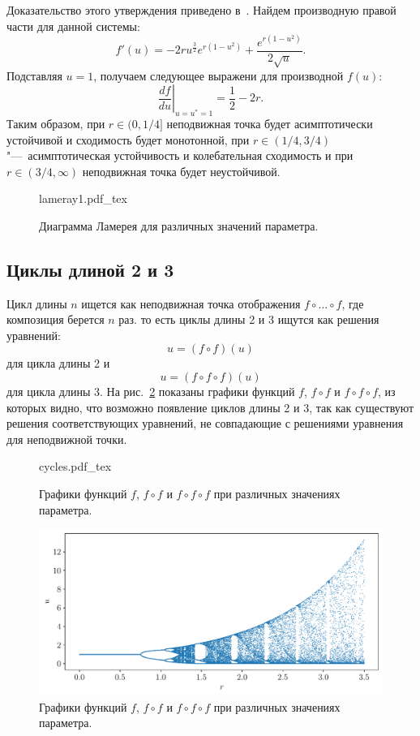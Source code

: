 \documentclass[12pt, a4paper]{article} %
\newcommand{\incfig}[1]{%
    \def\svgwidth{\columnwidth}
    {#1.pdf_tex}
}
\begin{document}
Доказательство этого утверждения приведено в~\cite[с.~83]{Bratus}.
Найдем производную правой части для данной системы:
 \begin{equation}
     f'(u) = - 2 r u^{\frac{3}{2}} e^{r \left(1 - u^{2}\right)} + \frac{e^{r \left(1 - u^{2}\right)}}{2 \sqrt{u}}
.\end{equation} 
Подставляя $u = 1$, получаем следующее выражени для производной  $f(u)$:
 \begin{equation}
     \left. \frac{df}{du} \right|_{u=u^*=1} = \frac{1}{2} - 2r
.\end{equation} 
Таким образом, при $r \in (0, 1\!/\!4]$ неподвижная точка будет асимптотически устойчивой и сходимость будет монотонной,
при $r \in (1\!/\!4, 3/\!4)$"---~асимптотическая устойчивость и колебательная сходимость и 
при $r \in (3 /\!4, \infty)$ неподвижная точка будет неустойчивой.

\begin{figure}[ht]
    \centering
    \incfig{lameray1}
    \caption{Диаграмма Ламерея для различных значений параметра.}
    \label{fig:lameray1}
\end{figure}

\subsection{Циклы длиной 2 и 3}

Цикл длины $n$ ищется как неподвижная точка отображения  $f\circ \ldots \circ f$, где композиция берется $n$ раз.
то есть циклы длины 2 и 3 ищутся как решения уравнений:
\begin{equation}
    u = (f\circ f)(u)
\end{equation} 
для цикла длины 2 и
\begin{equation}
    u = (f \circ f \circ f)(u)
\end{equation}
для цикла длины 3.
На рис.~\ref{fig:lameray1} показаны графики функций $f$,  $f \circ f$ и
$f \circ f \circ f$, из которых видно, что возможно появление циклов длины 2 и 3,
так как существуют решения соответствующих уравнений, не совпадающие с решениями уравнения для неподвижной точки.
\begin{figure}[ht]
    \centering
    \incfig{cycles}
    \caption{Графики функций $f$,  $f \circ f$ и $f \circ f \circ f$ при различных значениях параметра.}
    \label{fig:lameray1}
\end{figure}

\begin{figure}[ht]
    \centering
    \includegraphics[width=\textwidth]{figures/bifurc1.pdf}
    \caption{Графики функций $f$,  $f \circ f$ и $f \circ f \circ f$ при различных значениях параметра.}
    \label{fig:bifurc1}
\end{figure}



 
\end{document}
